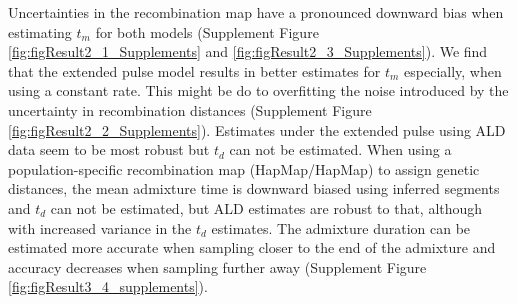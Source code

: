 \documentclass[11pt]{article}
\begin{document}
Uncertainties in the recombination map have a pronounced downward bias when estimating $t_m$ for both models (Supplement Figure \ref{fig:figResult2_1_Supplements} and \ref{fig:figResult2_3_Supplements}). We find that the extended pulse model results in better estimates for $t_m$ especially, when using a constant rate. This might be do to overfitting the noise introduced by the uncertainty in recombination distances (Supplement Figure \ref{fig:figResult2_2_Supplements}). Estimates under the extended pulse using ALD data seem to be most robust but $t_d$ can not be estimated. When using a population-specific recombination map (HapMap/HapMap) to assign genetic distances, the mean admixture time is downward biased using inferred segments and $t_d$ can not be estimated, but ALD estimates are robust to that, although with increased variance in the $t_d$ estimates.
The admixture duration can be estimated more accurate when sampling closer to the end of the admixture and accuracy decreases when sampling further away (Supplement Figure \ref{fig:figResult3_4_supplements}).
\end{document}
